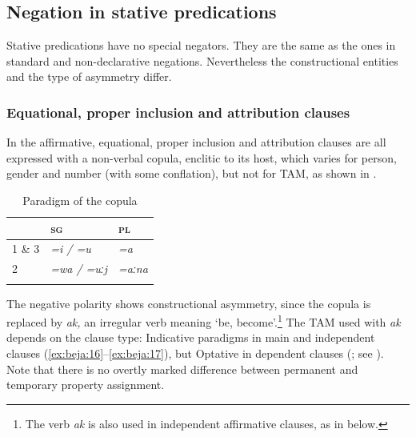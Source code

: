 \documentclass[output=paper,colorlinks,citecolor=brown]{langscibook}
\begin{document}
\subsection{Negation in stative predications}

Stative predications have no special negators. They are the same as the ones in standard and non-declarative negations. Nevertheless the constructional entities and the type of asymmetry differ.

\subsubsection{Equational, proper inclusion and attribution clauses}

In the affirmative, equational, proper inclusion and attribution clauses are all expressed with a non-verbal copula, enclitic to its host, which varies for person, gender and number (with some conflation), but not for TAM, as shown in .

\begin{table}
\begin{tabularx}{0.5\textwidth}{XXl}
\lsptoprule
& {\bfseries \textsc{sg}} & {\bfseries \textsc{pl}}\\
\midrule 
{ 1 \& 3} & \textit{=i / =u} & \textit{=a}\\
{ 2} & \textit{=wa / =uːj} & \textit{=aːna}\\
\lspbottomrule
\end{tabularx}
\itshape
\caption{Paradigm of the copula}
\label{tab:beja:4}
\end{table}

The negative polarity shows constructional asymmetry, since the copula is replaced by \textit{ak,} an irregular verb meaning ‘be, become’.\footnote{The verb \textit{ak} is also used in independent affirmative clauses, as in  below.} The TAM used with \textit{ak} depends on the clause type: Indicative paradigms in main and independent clauses (\ref{ex:beja:16}--\ref{ex:beja:17}), but Optative in dependent clauses (; see ). Note that there is no overtly marked difference between permanent and temporary property assignment.
\end{document}
